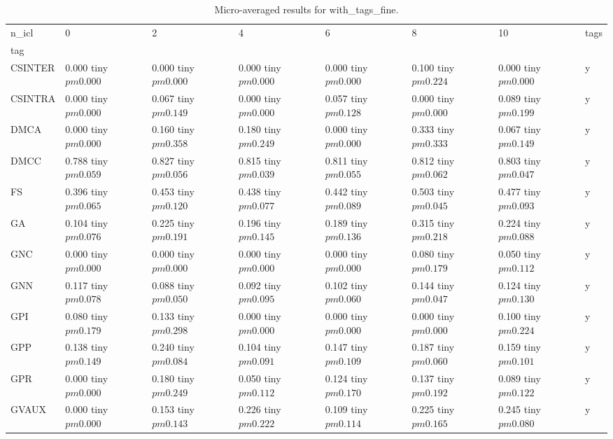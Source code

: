 \begin{table}
\caption{Micro-averaged results for with_tags_fine.}
\label{results_micro}
\begin{tabular}{llllllll}
\toprule
n_icl & 0 & 2 & 4 & 6 & 8 & 10 & tags \\
tag &  &  &  &  &  &  &  \\
\midrule
CSINTER & 0.000 tiny $ pm 0.000$ & 0.000 tiny $ pm 0.000$ & 0.000 tiny $ pm 0.000$ & 0.000 tiny $ pm 0.000$ & 0.100 tiny $ pm 0.224$ & 0.000 tiny $ pm 0.000$ & y \\
CSINTRA & 0.000 tiny $ pm 0.000$ & 0.067 tiny $ pm 0.149$ & 0.000 tiny $ pm 0.000$ & 0.057 tiny $ pm 0.128$ & 0.000 tiny $ pm 0.000$ & 0.089 tiny $ pm 0.199$ & y \\
DMCA & 0.000 tiny $ pm 0.000$ & 0.160 tiny $ pm 0.358$ & 0.180 tiny $ pm 0.249$ & 0.000 tiny $ pm 0.000$ & 0.333 tiny $ pm 0.333$ & 0.067 tiny $ pm 0.149$ & y \\
DMCC & 0.788 tiny $ pm 0.059$ & 0.827 tiny $ pm 0.056$ & 0.815 tiny $ pm 0.039$ & 0.811 tiny $ pm 0.055$ & 0.812 tiny $ pm 0.062$ & 0.803 tiny $ pm 0.047$ & y \\
FS & 0.396 tiny $ pm 0.065$ & 0.453 tiny $ pm 0.120$ & 0.438 tiny $ pm 0.077$ & 0.442 tiny $ pm 0.089$ & 0.503 tiny $ pm 0.045$ & 0.477 tiny $ pm 0.093$ & y \\
GA & 0.104 tiny $ pm 0.076$ & 0.225 tiny $ pm 0.191$ & 0.196 tiny $ pm 0.145$ & 0.189 tiny $ pm 0.136$ & 0.315 tiny $ pm 0.218$ & 0.224 tiny $ pm 0.088$ & y \\
GNC & 0.000 tiny $ pm 0.000$ & 0.000 tiny $ pm 0.000$ & 0.000 tiny $ pm 0.000$ & 0.000 tiny $ pm 0.000$ & 0.080 tiny $ pm 0.179$ & 0.050 tiny $ pm 0.112$ & y \\
GNN & 0.117 tiny $ pm 0.078$ & 0.088 tiny $ pm 0.050$ & 0.092 tiny $ pm 0.095$ & 0.102 tiny $ pm 0.060$ & 0.144 tiny $ pm 0.047$ & 0.124 tiny $ pm 0.130$ & y \\
GPI & 0.080 tiny $ pm 0.179$ & 0.133 tiny $ pm 0.298$ & 0.000 tiny $ pm 0.000$ & 0.000 tiny $ pm 0.000$ & 0.000 tiny $ pm 0.000$ & 0.100 tiny $ pm 0.224$ & y \\
GPP & 0.138 tiny $ pm 0.149$ & 0.240 tiny $ pm 0.084$ & 0.104 tiny $ pm 0.091$ & 0.147 tiny $ pm 0.109$ & 0.187 tiny $ pm 0.060$ & 0.159 tiny $ pm 0.101$ & y \\
GPR & 0.000 tiny $ pm 0.000$ & 0.180 tiny $ pm 0.249$ & 0.050 tiny $ pm 0.112$ & 0.124 tiny $ pm 0.170$ & 0.137 tiny $ pm 0.192$ & 0.089 tiny $ pm 0.122$ & y \\
GVAUX & 0.000 tiny $ pm 0.000$ & 0.153 tiny $ pm 0.143$ & 0.226 tiny $ pm 0.222$ & 0.109 tiny $ pm 0.114$ & 0.225 tiny $ pm 0.165$ & 0.245 tiny $ pm 0.080$ & y \\

\end{tabular}
\end{table}
